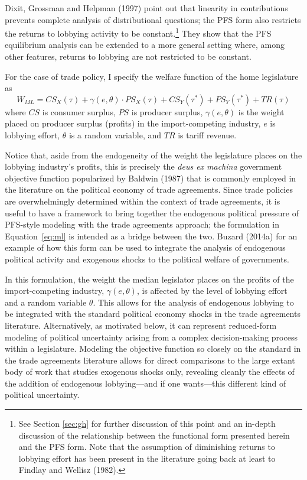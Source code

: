 \documentclass[10pt]{article}
\newcommand{\ve}{\theta}
\newcommand{\ta}{\theta}
\newcommand{\ga}{\gamma}
\begin{document}
Dixit, Grossman and Helpman (1997) point out that linearity in contributions prevents complete analysis of distributional questions; the PFS form also restricts the returns to lobbying activity to be constant.\footnote{See Section \ref{sec:gh} for further discussion of this point and an in-depth discussion of the relationship between the functional form presented herein and the PFS form. Note that the assumption of diminishing returns to lobbying effort has been present in the literature going back at least to Findlay and Wellisz (1982).} They show that the PFS equilibrium analysis can be extended to a more general setting where, among other features, returns to lobbying are not restricted to be constant. 

For the case of trade policy, I specify the welfare function of the home legislature as
\begin{equation}
  W_{\mathit{ML}} = \mathit{CS}_X(\tau) + \ga(e,\ve) \cdot \mathit{PS}_X(\tau) + \mathit{CS}_Y(\tau^*) + \mathit{PS}_Y(\tau^*) + \mathit{TR}(\tau)
  \label{eq:ml}
\end{equation}
where $\mathit{CS}$ is consumer surplus, $\mathit{PS}$ is producer surplus, $\ga(e,\ta)$ is the weight placed on producer surplus (profits) in the import-competing industry, $e$ is lobbying effort, $\ta$ is a random variable, and $\mathit{TR}$ is tariff revenue. 

Notice that, aside from the endogeneity of the weight the legislature places on the lobbying industry's profits, this is precisely the \textit{deus ex machina} government objective function popularized by Baldwin (1987) that is commonly employed in the literature on the political economy of trade agreements. Since trade policies are overwhelmingly determined within the context of trade agreements, it is useful to have a framework to bring together the endogenous political pressure of PFS-style modeling with the trade agreements approach; the formulation in Equation~\ref{eq:ml} is intended as a bridge between the two. Buzard (2014a) for an example of how this form can be used to integrate the analysis of endogenous political activity and exogenous shocks to the political welfare of governments.

In this formulation, the weight the median legislator places on the profits of the import-competing industry, $\ga(e,\ve)$, is affected by the level of lobbying effort and a random variable $\ta$. This allows for the analysis of endogenous lobbying to be integrated with the standard political economy shocks in the trade agreements literature. Alternatively, as motivated below, it can represent reduced-form modeling of political uncertainty arising from a complex decision-making process within a legislature. Modeling the objective function so closely on the standard in the trade agreements literature allows for direct comparisons to the large extant body of work that studies exogenous shocks only, revealing cleanly the effects of the addition of endogenous lobbying---and if one wants---this different kind of political uncertainty.
\end{document}
